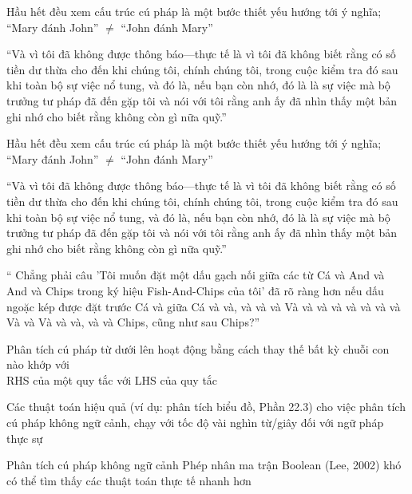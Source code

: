 \documentclass{article}
\begin{document}
\begin{huge}
\textwidth
{}


Hầu hết đều xem cấu trúc cú pháp là một bước thiết yếu hướng tới ý nghĩa;\al
``Mary đánh John'' $\neq$ ``John đánh Mary''

“Và vì tôi đã không được thông báo—thực tế là vì tôi đã không
biết rằng có số tiền dư thừa cho đến khi chúng tôi, chính chúng tôi, trong cuộc kiểm tra đó
sau khi toàn bộ sự việc nổ tung, và đó là, nếu bạn còn nhớ, đó là
là sự việc mà bộ trưởng tư pháp đã đến gặp tôi và nói với tôi
rằng anh ấy đã nhìn thấy một bản ghi nhớ cho biết rằng không còn gì nữa
quỹ.”


Hầu hết đều xem cấu trúc cú pháp là một bước thiết yếu hướng tới ý nghĩa;\al
``Mary đánh John'' $\neq$ ``John đánh Mary''

“Và vì tôi đã không được thông báo—thực tế là vì tôi đã không
biết rằng có số tiền dư thừa cho đến khi chúng tôi, chính chúng tôi, trong cuộc kiểm tra đó
sau khi toàn bộ sự việc nổ tung, và đó là, nếu bạn còn nhớ, đó là
là sự việc mà bộ trưởng tư pháp đã đến gặp tôi và nói với tôi
rằng anh ấy đã nhìn thấy một bản ghi nhớ cho biết rằng không còn gì nữa
quỹ.”

`` Chẳng phải câu 'Tôi muốn đặt một dấu gạch nối giữa các từ Cá
và And và And và Chips trong ký hiệu Fish-And-Chips của tôi' đã rõ ràng hơn
nếu dấu ngoặc kép được đặt trước Cá và giữa Cá và
và, và và và Và và và và và và và và Và và Và và
và, và và Chips, cũng như sau Chips?''



Phân tích cú pháp từ dưới lên hoạt động bằng cách thay thế bất kỳ chuỗi con nào khớp với\\
RHS của một quy tắc với LHS của quy tắc

Các thuật toán hiệu quả (ví dụ: phân tích biểu đồ, Phần 22.3)  cho việc phân tích cú pháp không ngữ cảnh,
chạy với tốc độ vài nghìn từ/giây đối với ngữ pháp thực sự

Phân tích cú pháp không ngữ cảnh \mat{$\equiv$} Phép nhân ma trận Boolean (Lee, 2002)\nl
\mat{$\implies$} khó có thể tìm thấy các thuật toán thực tế nhanh hơn 



\end{huge}
\end{document}
